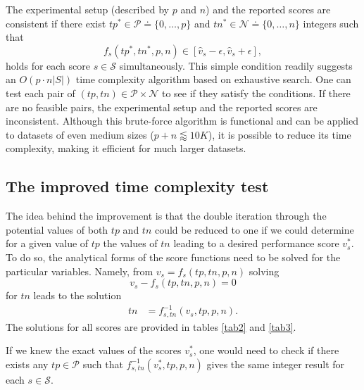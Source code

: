 \documentclass[3p, times]{elsarticle}
\begin{document}
The experimental setup (described by $p$ and $n$) and the reported scores are consistent if there exist $tp^* \in \mathcal{P} \doteq \lbrace 0, \dots, p\rbrace$ and $tn^*\in\mathcal{N}\doteq \lbrace 0, \dots, n\rbrace$ integers such that
\begin{equation}
\label{eqtest0}
f_s(tp^*, tn^*, p, n) \in [\hat{v}_s - \epsilon, \hat{v}_s + \epsilon],
\end{equation}
holds for each score $s\in\mathcal{S}$ simultaneously. This simple condition readily suggests an $O(p\cdot n\vert S\vert)$ time complexity algorithm based on exhaustive search. One can test each pair of $(tp, tn)\in \mathcal{P}\times\mathcal{N}$ to see if they satisfy the conditions. If there are no feasible pairs, the experimental setup and the reported scores are inconsistent. Although this brute-force algorithm is functional and can be applied to datasets of even medium sizes ($p + n \lessapprox 10K$), it is possible to reduce its time complexity, making it efficient for much larger datasets.

\subsection{The improved time complexity test}
\label{sec:improved}

The idea behind the improvement is that the double iteration through the potential values of both $tp$ and $tn$ could be reduced to one if we could determine for a given value of $tp$ the values of $tn$ leading to a desired performance score $v_s^{*}$. To do so, the analytical forms of the score functions need to be solved for the particular variables. Namely, from $v_s = f_s(tp, tn, p, n)$ solving
\begin{equation}
v_s - f_s(tp, tn, p, n) = 0
\end{equation}
for $tn$ leads to the solution
\begin{align}
\label{eq:solution}
tn &= f_{s, tn}^{-1}(v_s, tp, p, n).
\end{align}
The solutions for all scores are provided in tables \ref{tab2} and \ref{tab3}.

If we knew the exact values of the scores $v_s^*$, one would need to check if there exists any $tp\in\mathcal{P}$ such that \break $f_{s, tn}^{-1}(v_s^*, tp, p, n)$ gives the same integer result for each $s\in\mathcal{S}$.
\end{document}
